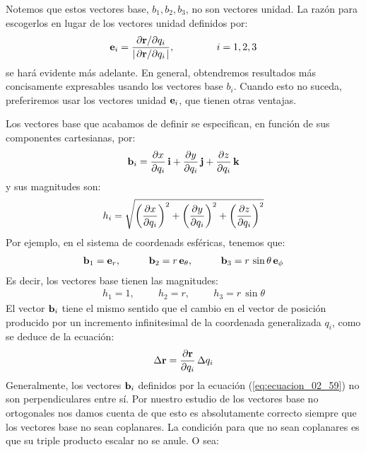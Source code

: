 Notemos que estos vectores base, $b_{1}, b_{2}, b_{3}$, no son vectores unidad. La razón para escogerlos en lugar de los vectores unidad definidos por:
\begin{align}
\vb{e}_{i} = \dfrac{\pdv*{\vb{r}}{q_{i}}}{\abs{\pdv*{\vb{r}}{q_{i}}}}, \hspace{1.5cm} i = 1, 2, 3
\label{eq:ecuacion_02_58}
\end{align}
se hará evidente más adelante. En general, obtendremos resultados más concisamente expresables usando los vectores base $b_{i}$. Cuando 
esto no suceda, preferiremos usar los vectores unidad $\vb{e}_{i}$, que tienen otras ventajas. 
\par
Los vectores base que acabamos de definir se especifican, en función de sus componentes cartesianas, por:
\begin{align}
    \vb{b}_{i} = \pdv{x}{q_{i}} \, \vb{i} + \pdv{y}{q_{i}} \, \vb{j} + \pdv{z}{q_{i}} \, \vb{k}
    \label{eq:ecuacion_02_59}  
\end{align} 
y sus magnitudes son:
\begin{align}
    h_{i} = \sqrt{\left( \pdv{x}{q_{i}} \right)^{2} + \left( \pdv{y}{q_{i}} \right)^{2} + \left( \pdv{z}{q_{i}} \right)^{2}}
    \label{eq:ecuacion_02_60}
\end{align}
Por ejemplo, en el sistema de coordenads esféricas, tenemos que:
\begin{align*}
    \vb{b}_{1} = \vb{e}_{r}, \hspace{1cm} \vb{b}_{2} = r \, \vb{e}_{\theta}, \hspace{1cm} \vb{b}_{3} = r \, \sin \theta \, \vb{e}_{\phi}
\end{align*}
Es decir, los vectores base tienen las magnitudes:
\begin{align*}
    h_{1} = 1, \hspace{1cm} h_{2} = r, \hspace{1cm} h_{3} = r \, \sin \theta
\end{align*}
El vector $\vb{b}_{i}$ tiene el mismo sentido que el cambio en el vector de posición producido por un incremento infinitesimal de la coordenada generalizada $q_{i}$, como se deduce de la ecuación:
\begin{align*}
    \Delta \vb{r} = \pdv{\vb{r}}{q_{i}} \, \Delta q_{i}
\end{align*}
Generalmente, los vectores $\vb{b}_{i}$ definidos por la ecuación (\ref{eq:ecuacion_02_59}) no son perpendiculares entre sí. Por nuestro estudio de los vectores base no ortogonales nos damos cuenta de que esto es absolutamente correcto siempre que los vectores base no sean coplanares. La condición para que no sean coplanares es que su triple producto escalar no se anule. O sea:

